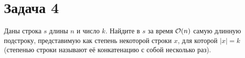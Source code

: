 \section{Задача 4}
Даны строка $s$ длины $n$ и число $k$. Найдите в $s$ за время $\mathcal{O}(n)$ самую длинную подстроку,
представимую как степень  некоторой строки $x$, для которой $|x| = k$ (степенью строки
называют её конкатенацию с собой несколько раз).
